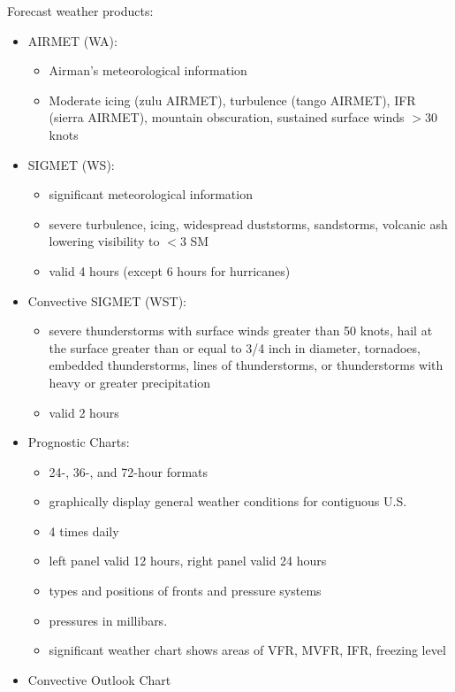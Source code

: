 \documentclass[twoside,openright]{report}
\begin{document}
Forecast weather products:

\begin{itemize}
  \item AIRMET (WA):
    \begin{itemize}
      \item Airman's meteorological information
      \item Moderate icing (zulu AIRMET), turbulence (tango AIRMET), IFR
        (sierra AIRMET), mountain obscuration, sustained surface winds $>$30
        knots
    \end{itemize}
  \item SIGMET (WS):
    \begin{itemize}
      \item significant meteorological information
      \item severe turbulence, icing, widespread duststorms, sandstorms,
        volcanic ash lowering visibility to $<$3 SM
      \item valid 4 hours (except 6 hours for hurricanes)
    \end{itemize}
  \item Convective SIGMET (WST):
    \begin{itemize}
      \item severe thunderstorms with surface winds greater than 50 knots, hail
        at the surface greater than or equal to 3/4 inch in diameter,
        tornadoes, embedded thunderstorms, lines of thunderstorms, or
        thunderstorms with heavy or greater precipitation
      \item valid 2 hours
    \end{itemize}
  \item Prognostic Charts:
    \begin{itemize}
      \item 24-, 36-, and 72-hour formats
      \item graphically display general weather conditions for contiguous U.S.
      \item 4 times daily
      \item left panel valid 12 hours, right panel valid 24 hours
      \item types and positions of fronts and pressure systems
      \item pressures in millibars.
      \item significant weather chart shows areas of VFR, MVFR, IFR, freezing
        level
    \end{itemize}
  \item Convective Outlook Chart

\end{itemize}
\end{document}
